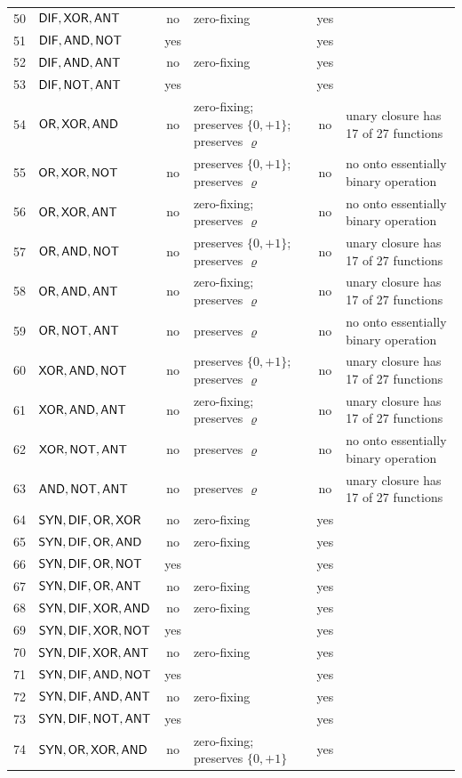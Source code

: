 \documentclass[10pt,a4paper]{article}
\begin{document}
\begin{center}
\begin{longtable}{rlcp{3.9cm}cp{3.9cm}}
50&$\mathsf{DIF}, \mathsf{XOR}, \mathsf{ANT}$&no&zero-fixing&yes&\\
51&$\mathsf{DIF}, \mathsf{AND}, \mathsf{NOT}$&yes&&yes&\\
52&$\mathsf{DIF}, \mathsf{AND}, \mathsf{ANT}$&no&zero-fixing&yes&\\
53&$\mathsf{DIF}, \mathsf{NOT}, \mathsf{ANT}$&yes&&yes&\\
54&$\mathsf{OR}, \mathsf{XOR}, \mathsf{AND}$&no&zero-fixing; preserves $\{0,+1\}$; preserves $\varrho$&no&unary closure has 17 of 27 functions\\
55&$\mathsf{OR}, \mathsf{XOR}, \mathsf{NOT}$&no&preserves $\{0,+1\}$; preserves $\varrho$&no&no onto essentially binary operation\\
56&$\mathsf{OR}, \mathsf{XOR}, \mathsf{ANT}$&no&zero-fixing; preserves $\varrho$&no&no onto essentially binary operation\\
57&$\mathsf{OR}, \mathsf{AND}, \mathsf{NOT}$&no&preserves $\{0,+1\}$; preserves $\varrho$&no&unary closure has 17 of 27 functions\\
58&$\mathsf{OR}, \mathsf{AND}, \mathsf{ANT}$&no&zero-fixing; preserves $\varrho$&no&unary closure has 17 of 27 functions\\
59&$\mathsf{OR}, \mathsf{NOT}, \mathsf{ANT}$&no&preserves $\varrho$&no&no onto essentially binary operation\\
60&$\mathsf{XOR}, \mathsf{AND}, \mathsf{NOT}$&no&preserves $\{0,+1\}$; preserves $\varrho$&no&unary closure has 17 of 27 functions\\
61&$\mathsf{XOR}, \mathsf{AND}, \mathsf{ANT}$&no&zero-fixing; preserves $\varrho$&no&unary closure has 17 of 27 functions\\
62&$\mathsf{XOR}, \mathsf{NOT}, \mathsf{ANT}$&no&preserves $\varrho$&no&no onto essentially binary operation\\
63&$\mathsf{AND}, \mathsf{NOT}, \mathsf{ANT}$&no&preserves $\varrho$&no&unary closure has 17 of 27 functions\\
64&$\mathsf{SYN}, \mathsf{DIF}, \mathsf{OR}, \mathsf{XOR}$&no&zero-fixing&yes&\\
65&$\mathsf{SYN}, \mathsf{DIF}, \mathsf{OR}, \mathsf{AND}$&no&zero-fixing&yes&\\
66&$\mathsf{SYN}, \mathsf{DIF}, \mathsf{OR}, \mathsf{NOT}$&yes&&yes&\\
67&$\mathsf{SYN}, \mathsf{DIF}, \mathsf{OR}, \mathsf{ANT}$&no&zero-fixing&yes&\\
68&$\mathsf{SYN}, \mathsf{DIF}, \mathsf{XOR}, \mathsf{AND}$&no&zero-fixing&yes&\\
69&$\mathsf{SYN}, \mathsf{DIF}, \mathsf{XOR}, \mathsf{NOT}$&yes&&yes&\\
70&$\mathsf{SYN}, \mathsf{DIF}, \mathsf{XOR}, \mathsf{ANT}$&no&zero-fixing&yes&\\
71&$\mathsf{SYN}, \mathsf{DIF}, \mathsf{AND}, \mathsf{NOT}$&yes&&yes&\\
72&$\mathsf{SYN}, \mathsf{DIF}, \mathsf{AND}, \mathsf{ANT}$&no&zero-fixing&yes&\\
73&$\mathsf{SYN}, \mathsf{DIF}, \mathsf{NOT}, \mathsf{ANT}$&yes&&yes&\\
74&$\mathsf{SYN}, \mathsf{OR}, \mathsf{XOR}, \mathsf{AND}$&no&zero-fixing; preserves $\{0,+1\}$&yes&\\

\end{longtable}
\end{center}
\end{document}
